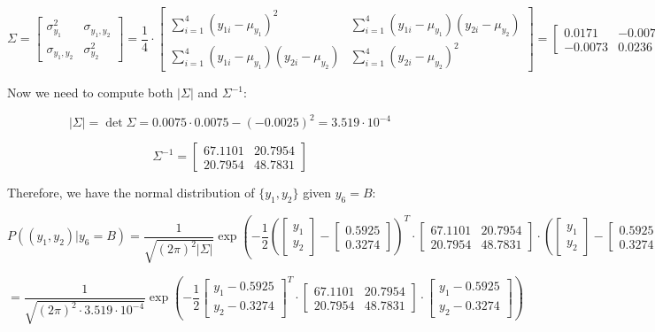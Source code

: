 \documentclass{article}
\begin{document}
\[
  \Sigma = \left[ \begin{matrix}
    \sigma_{y_1}^2 & \sigma_{y_1,y_2} \\
    \sigma_{y_1,y_2} & \sigma_{y_2}^2
  \end{matrix} \right] = \frac{1}{4} \cdot \begin{bmatrix}
    \sum_{i=1}^{4} (y_{1i} - \mu_{y_1})^2 & \sum_{i=1}^{4} (y_{1i} - \mu_{y_1})(y_{2i} - \mu_{y_2}) \\
    \sum_{i=1}^{4} (y_{1i} - \mu_{y_1})(y_{2i} - \mu_{y_2}) & \sum_{i=1}^{4} (y_{2i} - \mu_{y_2})^2
  \end{bmatrix}  = \begin{bmatrix}
    0.0171 & -0.0073 \\
    -0.0073 & 0.0236
  \end{bmatrix}
\]

Now we need to compute both $|\Sigma|$ and $\Sigma^{-1}$:

\[
  |\Sigma| = \det \Sigma = 0.0075 \cdot 0.0075 - (-0.0025)^2 = 3.519 \cdot 10^{-4}
\]

\[
  \Sigma^{-1} = \begin{bmatrix}
    67.1101 & 20.7954 \\
    20.7954 & 48.7831
  \end{bmatrix}
\]

Therefore, we have the normal distribution of $\{y_1,y_2\}$ given $y_6=B$:

\[
    P((y_1,y_2)|y_6=B) = \frac{1}{\sqrt{(2\pi)^2 |\Sigma|}} \exp \left( -\frac{1}{2} \left(\begin{bmatrix} y_1 \\ y_2 \end{bmatrix} - \begin{bmatrix} 0.5925 \\ 0.3274 \end{bmatrix}\right)^T \cdot \begin{bmatrix}
    67.1101 & 20.7954 \\
    20.7954 & 48.7831
  \end{bmatrix} \cdot \left(\begin{bmatrix} y_1 \\ y_2 \end{bmatrix} - \begin{bmatrix} 0.5925 \\ 0.3274 \end{bmatrix}\right) \right)
\]

\[
  = \frac{1}{\sqrt{(2\pi)^2 \cdot 3.519 \cdot 10^{-4}}} \exp \left( -\frac{1}{2} \left[ \begin{matrix} y_1 - 0.5925 \\ y_2 - 0.3274 \end{matrix} \right]^T \cdot \begin{bmatrix}
    67.1101 & 20.7954 \\
    20.7954 & 48.7831  
  \end{bmatrix} \cdot \left[ \begin{matrix} y_1 - 0.5925 \\ y_2 - 0.3274 \end{matrix} \right] \right)
\]
\end{document}
